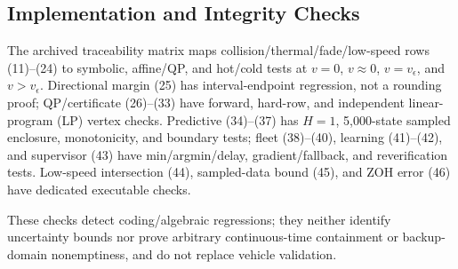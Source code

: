 \subsection{Implementation and Integrity Checks}
The archived traceability matrix maps collision/thermal/fade/low-speed rows (11)--(24) to symbolic, affine/QP, and hot/cold tests at $v=0$, $v\approx0$, $v=v_\epsilon$, and $v>v_\epsilon$. Directional margin (25) has interval-endpoint regression, not a rounding proof; QP/certificate (26)--(33) have forward, hard-row, and independent linear-program (LP) vertex checks. Predictive (34)--(37) has $H=1$, 5,000-state sampled enclosure, monotonicity, and boundary tests; fleet (38)--(40), learning (41)--(42), and supervisor (43) have min/argmin/delay, gradient/fallback, and reverification tests. Low-speed intersection (44), sampled-data bound (45), and ZOH error (46) have dedicated executable checks.

These checks detect coding/algebraic regressions; they neither identify uncertainty bounds nor prove arbitrary continuous-time containment or backup-domain nonemptiness, and do not replace vehicle validation.
